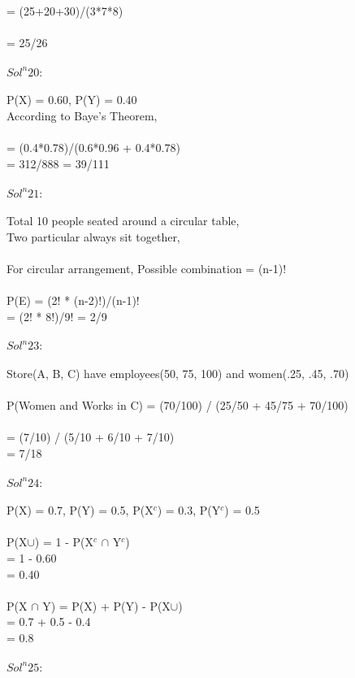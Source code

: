 \documentclass{article}
\begin{document}
= (25+20+30)/(3*7*8)\\\\
= 25/26 \\\\
\textbf{$Sol^n 20:$} \\ \\
P(X) = 0.60, P(Y) = 0.40 \\
According to Baye's Theorem, \\\\
= (0.4*0.78)/(0.6*0.96 + 0.4*0.78) \\
= 312/888 = 39/111 \\\\
\textbf{$Sol^n 21:$} \\ \\
Total 10 people seated around a circular table,\\
Two particular always sit together,\\\\
For circular arrangement, Possible combination = (n-1)! \\\\
P(E) = (2! * (n-2)!)/(n-1)! \\
= (2! * 8!)/9! = 2/9 \\\\
\textbf{$Sol^n 23:$} \\ \\
Store(A, B, C) have employees(50, 75, 100) and women(.25, .45, .70) \\\\
P(Women and Works in C) = (70/100) / (25/50 + 45/75 + 70/100) \\\\
= (7/10) / (5/10 + 6/10 + 7/10) \\
= 7/18\\\\
\textbf{$Sol^n 24:$} \\ \\
P(X) = 0.7, P(Y) = 0.5, P(X$^c$) = 0.3, P(Y$^c$) = 0.5 \\\\
P(X$\cup$) = 1 - P(X$^c$ $\cap$ Y$^c$)\\
= 1 - 0.60 \\
= 0.40\\\\
P(X $\cap$ Y) = P(X) + P(Y) - P(X$\cup$)\\
= 0.7 + 0.5 - 0.4 \\
= 0.8 \\\\
\textbf{$Sol^n 25:$} \\ \\
\end{document}
